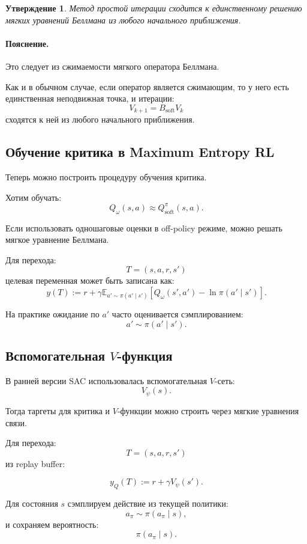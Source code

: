 \documentclass[12pt,a4paper]{article}
\newtheorem{statement}{Утверждение}
\begin{document}
\begin{statement}
Метод простой итерации сходится к единственному решению мягких уравнений Беллмана из любого начального приближения.
\end{statement}

\paragraph{Пояснение.}

Это следует из сжимаемости мягкого оператора Беллмана.

Как и в обычном случае, если оператор является сжимающим, то у него есть единственная неподвижная точка, и итерации:
\[
V_{k+1}
=
B_{\mathrm{soft}}V_k
\]
сходятся к ней из любого начального приближения.

\subsection{Обучение критика в Maximum Entropy RL}

Теперь можно построить процедуру обучения критика.

Хотим обучать:
\[
Q_\omega(s,a)
\approx
Q^\pi_{\mathrm{soft}}(s,a).
\]

Если использовать одношаговые оценки в off-policy режиме, можно решать мягкое уравнение Беллмана.

Для перехода:
\[
T=(s,a,r,s')
\]
целевая переменная может быть записана как:
\[
y(T)
:=
r
+
\gamma
\mathbb E_{a'\sim\pi(a'\mid s')}
\left[
Q_\omega(s',a')
-
\ln\pi(a'\mid s')
\right].
\]

На практике ожидание по $a'$ часто оценивается сэмплированием:
\[
a'\sim\pi(a'\mid s').
\]

\subsection{Вспомогательная $V$-функция}

В ранней версии SAC использовалась вспомогательная $V$-сеть:
\[
V_\psi(s).
\]

Тогда таргеты для критика и $V$-функции можно строить через мягкие уравнения связи.

Для перехода:
\[
T=(s,a,r,s')
\]
из replay buffer:

\[
y_Q(T)
:=
r
+
\gamma
V_\psi(s').
\]

Для состояния $s$ сэмплируем действие из текущей политики:
\[
a_\pi\sim\pi(a_\pi\mid s),
\]
и сохраняем вероятность:
\[
\pi(a_\pi\mid s).
\]
\end{document}
